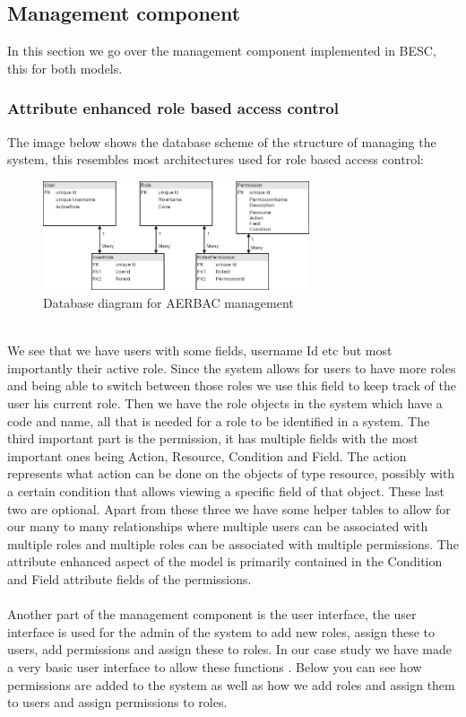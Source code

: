 \subsection{Management component}
In this section we go over the management component implemented in BESC, this for both models.

\subsubsection{Attribute enhanced role based access control}
The image below shows the database scheme of the structure of managing the system, this resembles most architectures used for role based access control:
\\
\begin{figure}[h]
    \centering
    \includegraphics[width=0.7\textwidth]{Img/self/RBACManagementDiagram.jpg}
    \caption{Database diagram for AERBAC management}
\end{figure}
\\
We see that we have users with some fields, username Id etc but most importantly their active role. Since the system allows for users to have more roles and being able to switch between those roles we use this field to keep track of the user his current role.
Then we have the role objects in the system which have a code and name, all that is needed for a role to be identified in a system.
The third important part is the permission, it has multiple fields with the most important ones being Action, Resource, Condition and Field. 
The action represents what action can be done on the objects of type resource, possibly with a certain condition that allows viewing a specific field of that object.
These last two are optional.
Apart from these three we have some helper tables to allow for our many to many relationships where multiple users can be associated with multiple roles and multiple roles can be associated with multiple permissions.
The attribute enhanced aspect of the model is primarily contained in the Condition and Field attribute fields of the permissions.
\\
\\
Another part of the management component is the user interface, the user interface is used for the admin of the system to add new roles, assign these to users, add permissions and assign these to roles.
In our case study we have made a very basic user interface to allow these functions .
Below you can see how permissions are added to the system as well as how we add roles and assign them to users and assign permissions to roles.

